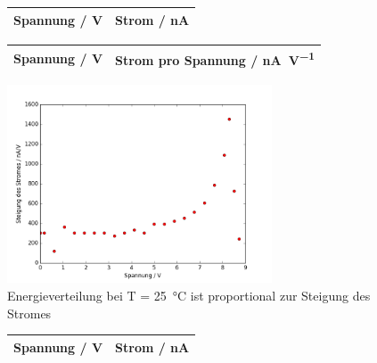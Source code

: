 \begin{figure}
	\centering
	\begin{tabular}{cc}
		Spannung / \si{\volt} & Strom /  \si{\nano\ampere}   \\
		\hline
		
	\end{tabular}
	\label{tab:stromverlauf_25}
\end{figure}

\begin{figure}
	\centering
	\begin{tabular}{cc}
		Spannung / \si{\volt} & Strom pro Spannung / \si{\nano\ampere\per\volt}   \\
		\hline
		
	\end{tabular}
	\label{tab:energieverteilung_25}
\end{figure}


\begin{figure}
	\centering
	\includegraphics[width=0.7\textwidth]{build/Energieverteilung_25.png}
	\caption{Energieverteilung bei  T = \SI{25}{\celsius} ist proportional zur Steigung des Stromes}
	\label{fig:energieverteilung_25}
\end{figure}

\begin{figure}
	\centering
	\begin{tabular}{cc}
		Spannung / \si{\volt} & Strom /  \si{\nano\ampere}   \\
		\hline
		
	\end{tabular}
	\label{tab:stromverlauf_140}
\end{figure}

